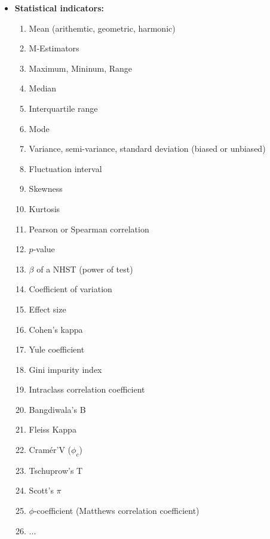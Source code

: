 \begin{itemize}
		\item \textbf{Statistical indicators:}
		\begin{multicols}{2}
		\begin{enumerate}
			\item Mean (arithemtic, geometric, harmonic)
			\item M-Estimators
			\item Maximum, Mininum, Range
			\item Median
			\item Interquartile range
			\item Mode
			\item Variance, semi-variance, standard deviation (biased or unbiased)
			\item Fluctuation interval
			\item Skewness
			\item Kurtosis
			\item Pearson or Spearman correlation
			\item $p$-value
			\item $\beta$ of a NHST (power of test)
			\item Coefficient of variation
			\item Effect size
			\item Cohen's kappa
			\item Yule coefficient
			\item Gini impurity index
			\item Intraclass correlation coefficient
			\item Bangdiwala's B
			\item Fleiss Kappa
			\item Cramér'V ($\phi_c$)
			\item Tschuprow's T 
			\item Scott's $\pi$
			\item $\phi$-coefficient (Matthews correlation coefficient)
			\item ...
		\end{enumerate}
		\end{multicols}
		

\end{itemize}
